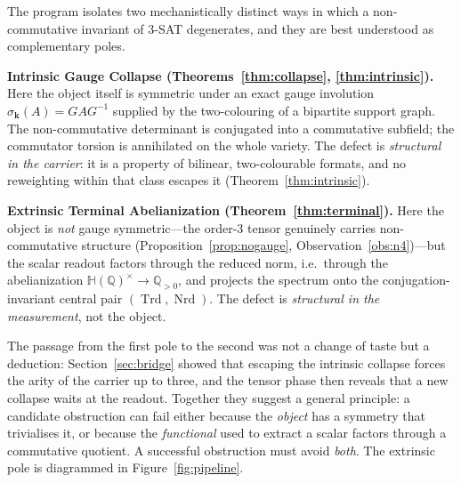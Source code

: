 \documentclass[pdflatex,sn-mathphys-num]{sn-jnl}
\theoremstyle{thmstyleone}%
\theoremstyle{thmstyletwo}%
\theoremstyle{thmstylethree}%
\newcommand{\HH}{\mathbb{H}}
\newcommand{\QQ}{\mathbb{Q}}
\newcommand{\Nrd}{\operatorname{Nrd}}
\newcommand{\Trd}{\operatorname{Trd}}
\newcommand{\bk}{\mathbf{k}}
\begin{document}
The program isolates two mechanistically distinct ways in which a
non-commutative invariant of $3$-SAT degenerates, and they are best
understood as complementary poles.

\medskip
\noindent\textbf{Intrinsic Gauge Collapse (Theorems~\ref{thm:collapse},
\ref{thm:intrinsic}).} Here the object itself is symmetric under an exact
gauge involution $\sigma_{\bk}(A)=GAG^{-1}$ supplied by the two-colouring of
a bipartite support graph. The non-commutative determinant is conjugated
into a commutative subfield; the commutator torsion is annihilated on the
whole variety. The defect is \emph{structural in the carrier}: it is a
property of bilinear, two-colourable formats, and no reweighting within that
class escapes it (Theorem~\ref{thm:intrinsic}).

\medskip
\noindent\textbf{Extrinsic Terminal Abelianization
(Theorem~\ref{thm:terminal}).} Here the object is \emph{not} gauge
symmetric---the order-$3$ tensor genuinely carries non-commutative
structure (Proposition~\ref{prop:nogauge}, Observation~\ref{obs:n4})---but
the scalar readout factors through the reduced norm, i.e.\ through the
abelianization $\HH(\QQ)^{\times}\to\QQ_{>0}$, and projects the spectrum onto
the conjugation-invariant central pair $(\Trd,\Nrd)$. The defect is
\emph{structural in the measurement}, not the object.

\medskip

The passage from the first pole to the second was not a change of taste but
a deduction: Section~\ref{sec:bridge} showed that escaping the intrinsic
collapse forces the arity of the carrier up to three, and the tensor phase
then reveals that a new collapse waits at the readout. Together they suggest
a general principle: a candidate obstruction can fail either because the
\emph{object} has a symmetry that trivialises it, or because the
\emph{functional} used to extract a scalar factors through a commutative
quotient. A successful obstruction must avoid \emph{both}. The extrinsic
pole is diagrammed in Figure~\ref{fig:pipeline}.
\end{document}
